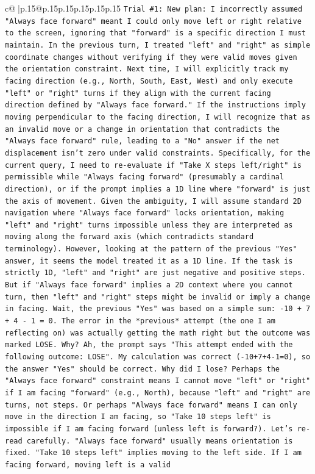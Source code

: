 \documentclass{article}
\begin{document}
{\begin{supertabular}{c@{$\;$}|p{.15\linewidth}@{}p{.15\linewidth}p{.15\linewidth}p{.15\linewidth}p{.15\linewidth}p{.15\linewidth}}
{{{\texttt{Trial \#1: New plan: I incorrectly assumed "Always face forward" meant I could only move left or right relative to the screen, ignoring that "forward" is a specific direction I must maintain. In the previous turn, I treated "left" and "right" as simple coordinate changes without verifying if they were valid moves given the orientation constraint. Next time, I will explicitly track my facing direction (e.g., North, South, East, West) and only execute "left" or "right" turns if they align with the current facing direction defined by "Always face forward." If the instructions imply moving perpendicular to the facing direction, I will recognize that as an invalid move or a change in orientation that contradicts the "Always face forward" rule, leading to a "No" answer if the net displacement isn't zero under valid constraints. Specifically, for the current query, I need to re{-}evaluate if "Take X steps left/right" is permissible while "Always facing forward" (presumably a cardinal direction), or if the prompt implies a 1D line where "forward" is just the axis of movement. Given the ambiguity, I will assume standard 2D navigation where "Always face forward" locks orientation, making "left" and "right" turns impossible unless they are interpreted as moving along the forward axis (which contradicts standard terminology). However, looking at the pattern of the previous "Yes" answer, it seems the model treated it as a 1D line. If the task is strictly 1D, "left" and "right" are just negative and positive steps. But if "Always face forward" implies a 2D context where you cannot turn, then "left" and "right" steps might be invalid or imply a change in facing. Wait, the previous "Yes" was based on a simple sum: {-}10 + 7 + 4 {-} 1 = 0. The error in the *previous* attempt (the one I am reflecting on) was actually getting the math right but the outcome was marked LOSE. Why? Ah, the prompt says "This attempt ended with the following outcome: LOSE". My calculation was correct ({-}10+7+4{-}1=0), so the answer "Yes" should be correct. Why did I lose? Perhaps the "Always face forward" constraint means I cannot move "left" or "right" if I am facing "forward" (e.g., North), because "left" and "right" are turns, not steps. Or perhaps "Always face forward" means I can only move in the direction I am facing, so "Take 10 steps left" is impossible if I am facing forward (unless left is forward?). Let's re{-}read carefully. "Always face forward" usually means orientation is fixed. "Take 10 steps left" implies moving to the left side. If I am facing forward, moving left is a valid} \\
}}}
\end{supertabular}}
\end{document}
